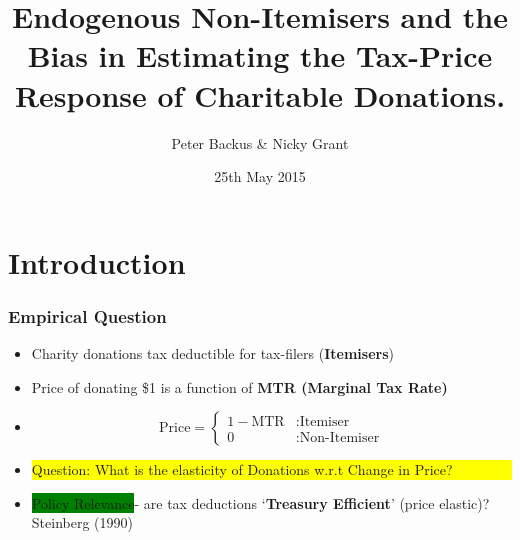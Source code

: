 \documentclass[options]{beamer}
\begin{document}
\title[Bias in Tax-Donation Response]{ Endogenous Non-Itemisers and the Bias in Estimating the Tax-Price Response of Charitable Donations. }

\author[PB \& NG]{Peter Backus \& Nicky Grant}


\date[   25th May 2015]{ 25th May 2015}


\maketitle

\section{Introduction}



\begin{frame}
\frametitle{Empirical Question}
\begin{itemize}
	
	\item[] Charity donations tax deductible for tax-filers (\textbf{Itemisers})
	\vspace{20pt}
	\item[] Price of donating \$1 is a function of\textbf{ MTR (Marginal Tax Rate) }

		\vspace{20pt}
	 \item[] \[\textrm{Price} = \left\{
	 \begin{array}{lr}
	 1-\textrm{MTR} & : \textrm{Itemiser}\\
	 0 & :  \textrm{Non-Itemiser}
	 \end{array}
	 \right.
	 \]
	
	\item[] \colorbox{yellow}{\parbox{\textwidth}{ Question: What is the  elasticity of Donations w.r.t Change in Price?}}
		\vspace{1pt}
	\item[] \colorbox{green}{Policy Relevance}- are tax deductions `\textbf{Treasury Efficient}' (price elastic)? Steinberg (1990)
	
	
\end{itemize}
\end{frame}
	
\end{document}
